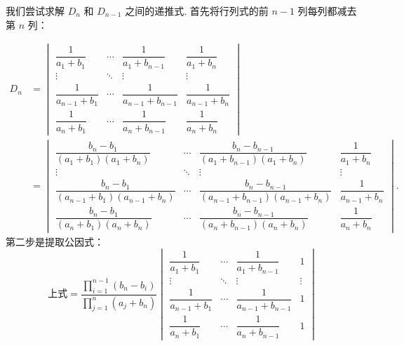 \documentclass[12pt,fontset=fandol]{ctexart}
\begin{document}
\begin{solve}
我们尝试求解 $D_n$ 和 $D_{n-1}$ 之间的递推式. 首先将行列式的前 $n-1$ 列每列都减去第 $n$ 列：

    \begin{align*}
        D_n & = \begin{vmatrix}
                    \dfrac{1}{a_1+b_1}     & \cdots & \dfrac{1}{a_1+b_{n-1}}     & \dfrac{1}{a_1+b_n}     \\[2ex]
                    \vdots                 & \ddots & \vdots                     & \vdots                 \\[2ex]
                    \dfrac{1}{a_{n-1}+b_1} & \cdots & \dfrac{1}{a_{n-1}+b_{n-1}} & \dfrac{1}{a_{n-1}+b_n} \\[2ex]
                    \dfrac{1}{a_n+b_1}     & \cdots & \dfrac{1}{a_n+b_{n-1}}     & \dfrac{1}{a_n+b_n}
                \end{vmatrix}                                                                       \\[2ex]
            & = \begin{vmatrix}
                    \dfrac{b_n-b_1}{(a_1+b_1)(a_1+b_n)}         & \cdots & \dfrac{b_n-b_{n-1}}{(a_1+b_{n-1})(a_1+b_n)}         & \dfrac{1}{a_1+b_n}     \\[2ex]
                    \vdots                                      & \ddots & \vdots                                              & \vdots                 \\[2ex]
                    \dfrac{b_n-b_1}{(a_{n-1}+b_1)(a_{n-1}+b_n)} & \cdots & \dfrac{b_n-b_{n-1}}{(a_{n-1}+b_{n-1})(a_{n-1}+b_n)} & \dfrac{1}{a_{n-1}+b_n} \\[2ex]
                    \dfrac{b_n-b_1}{(a_n+b_1)(a_n+b_n)}         & \cdots & \dfrac{b_n-b_{n-1}}{(a_n+b_{n-1})(a_n+b_n)}         & \dfrac{1}{a_n+b_n}
                \end{vmatrix}.
    \end{align*}
    第二步是提取公因式：
    \[ \text{上式} = \dfrac{\prod\limits_{i=1}^{n-1}(b_n-b_i)}{\prod\limits_{j=1}^{n}(a_j+b_n)}
        \begin{vmatrix}
            \dfrac{1}{a_1+b_1}     & \cdots & \dfrac{1}{a_1+b_{n-1}}     & 1      \\[2ex]
            \vdots                 & \ddots & \vdots                     & \vdots \\[2ex]
            \dfrac{1}{a_{n-1}+b_1} & \cdots & \dfrac{1}{a_{n-1}+b_{n-1}} & 1      \\[2ex]
            \dfrac{1}{a_n+b_1}     & \cdots & \dfrac{1}{a_n+b_{n-1}}     & 1

\end{vmatrix}\]
\end{solve}
\end{document}
